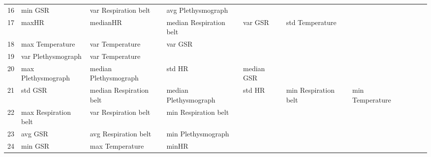 \begin{landscape}
\begin{table}[]
\begin{tabular}{l|llllllll}
16       & min GSR                 & var Respiration belt    & avg Plethysmograph      &                         &                         &                       &                         &                         &                         &         \\
17       & maxHR                   & medianHR                & median Respiration belt & var GSR                 & std Temperature         &                       &                         &                         &                         &         \\
18       & max Temperature         & var Temperature         & var GSR                 &                         &                         &                       &                         &                         &                         &         \\
19       & var Plethysmograph      & var Temperature         &                         &                         &                         &                       &                         &                         &                         &         \\
20       & max Plethysmograph      & median Plethysmograph   & std HR                  & median GSR              &                         &                       &                         &                         &                         &         \\
21       & std GSR                 & median Respiration belt & median Plethysmograph   & std HR                  & min Respiration belt    & min Temperature       &                         &                         &                         &         \\
22       & max Respiration belt    & var Respiration belt    & min Respiration belt    &                         &                         &                       &                         &                         &                         &         \\
23       & avg GSR                 & avg Respiration belt    & min Plethysmograph      &                         &                         &                       &                         &                         &                         &         \\
24       & min GSR                 & max Temperature         & minHR                   &                         &                         &                       &                         &                         &                         &         \\

\end{tabular}
\end{table}
\end{landscape}
